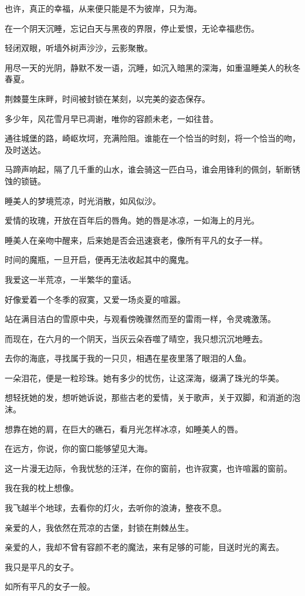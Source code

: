 	\endlongpoem
	\endwriting



		也许，真正的幸福，从来便只能是不为彼岸，只为海。


		\vspace{1em}
		在一个阴天沉睡，忘记白天与黑夜的界限，停止爱恨，无论幸福悲伤。\par
		轻闭双眼，听墙外树声沙沙，云影聚散。\par
		用尽一天的光阴，静默不发一语，沉睡，如沉入暗黑的深海，如重温睡美人的秋冬春夏。\par
		荆棘蔓生床畔，时间被封锁在某刻，以完美的姿态保存。\par
		多少年，风花雪月早已凋谢，唯你的容颜未老，一如往昔。\par
		通往城堡的路，崎岖坎坷，充满险阻。谁能在一个恰当的时刻，将一个恰当的吻，及时送达。\par
		马蹄声响起，隔了几千重的山水，谁会骑这一匹白马，谁会用锋利的佩剑，斩断锈蚀的锁链。\par
		睡美人的梦境荒凉，时光消散，如风似沙。\par
		爱情的玫瑰，开放在百年后的唇角。她的唇是冰凉，一如海上的月光。\par
		睡美人在亲吻中醒来，后来她是否会迅速衰老，像所有平凡的女子一样。\par
		时间的魔瓶，一旦开启，便再无法收起其中的魔鬼。

		我爱这一半荒凉，一半繁华的童话。\par
		好像爱着一个冬季的寂寞，又爱一场炎夏的喧嚣。\par
		站在满目洁白的雪原中央，与观看傍晚骤然而至的雷雨一样，令灵魂激荡。\par
		而现在，在六月的一个阴天，当灰云朵吞噬了晴空，我只想沉沉地睡去。\par
		去你的海底，寻找属于我的一只贝，相遇在星夜里落了眼泪的人鱼。\par
		一朵泪花，便是一粒珍珠。她有多少的忧伤，让这深海，缀满了珠光的华美。\par
		想轻抚她的发，想听她诉说，那些古老的爱情，关于歌声，关于双脚，和消逝的泡沫。\par
		想靠在她的肩，在巨大的礁石，看月光怎样冰凉，如睡美人的唇。\par
		在远方，你说，你的窗口能够望见大海。\par
		这一片漫无边际，令我忧愁的汪洋，在你的窗前，也许寂寞，也许喧嚣的窗前。\par
		我在我的枕上想像。\par
		我飞越半个地球，去看你的灯火，去听你的浪涛，整夜不息。\par
		亲爱的人，我依然在荒凉的古堡，封锁在荆棘丛生。\par
		亲爱的人，我却不曾有容颜不老的魔法，来有足够的可能，目送时光的离去。\par
		我只是平凡的女子。\par
		如所有平凡的女子一般。

